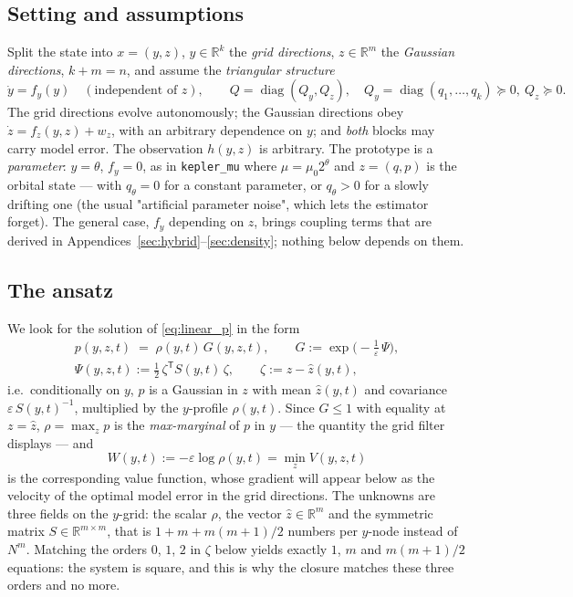 \documentclass[11pt,a4paper]{article}
\newcommand{\R}{\mathbb{R}}
\newcommand{\T}{^{\mathsf T}}
\newcommand{\zh}{\hat{z}}
\newcommand{\eps}{\varepsilon}
\theoremstyle{plain}
\theoremstyle{definition}
\theoremstyle{remark}
\begin{document}
\subsection{Setting and assumptions}

Split the state into $x=(y,z)$, $y\in\R^k$ the \emph{grid directions}, $z\in\R^m$ the \emph{Gaussian directions}, $k+m=n$, and assume the \emph{triangular structure}
\begin{equation}
  \dot y = f_y(y) \quad(\text{independent of }z), \qquad Q = \operatorname{diag}(Q_y, Q_z),\quad Q_y = \operatorname{diag}(q_1,\dots,q_k)\succeq0,\ Q_z\succeq0 .
  \label{eq:T_assumption}
\end{equation}
The grid directions evolve autonomously; the Gaussian directions obey $\dot z = f_z(y,z)+w_z$, with an arbitrary dependence on $y$; and \emph{both} blocks may carry model error. The observation $h(y,z)$ is arbitrary. The prototype is a \emph{parameter}: $y=\theta$, $f_y=0$, as in \texttt{kepler\_mu} where $\mu=\mu_0 2^\theta$ and $z=(q,p)$ is the orbital state --- with $q_\theta=0$ for a constant parameter, or $q_\theta>0$ for a slowly drifting one (the usual "artificial parameter noise", which lets the estimator forget). The general case, $f_y$ depending on $z$, brings coupling terms that are derived in Appendices~\ref{sec:hybrid}--\ref{sec:density}; nothing below depends on them.

\subsection{The ansatz}

We look for the solution of \eqref{eq:linear_p} in the form
\begin{equation}
\begin{gathered}
  p(y,z,t) \;=\; \rho(y,t)\,G(y,z,t), \qquad G := \exp\Big(-\frac{1}{\eps}\,\Psi\Big), \\
  \Psi(y,z,t) := \tfrac12\,\zeta\T S(y,t)\,\zeta, \qquad \zeta := z-\zh(y,t),
\end{gathered}
  \label{eq:T_ansatz}
\end{equation}
i.e.\ conditionally on $y$, $p$ is a Gaussian in $z$ with mean $\zh(y,t)$ and covariance $\eps\,S(y,t)^{-1}$, multiplied by the $y$-profile $\rho(y,t)$. Since $G\le1$ with equality at $z=\zh$, $\rho=\max_zp$ is the \emph{max-marginal} of $p$ in $y$ --- the quantity the grid filter displays --- and
\begin{equation}
  W(y,t) := -\eps\log\rho(y,t) = \min_zV(y,z,t)
  \label{eq:T_W}
\end{equation}
is the corresponding value function, whose gradient will appear below as the velocity of the optimal model error in the grid directions. The unknowns are three fields on the $y$-grid: the scalar $\rho$, the vector $\zh\in\R^m$ and the symmetric matrix $S\in\R^{m\times m}$, that is $1+m+m(m+1)/2$ numbers per $y$-node instead of $N^m$. Matching the orders $0$, $1$, $2$ in $\zeta$ below yields exactly $1$, $m$ and $m(m+1)/2$ equations: the system is square, and this is why the closure matches these three orders and no more.
\end{document}
